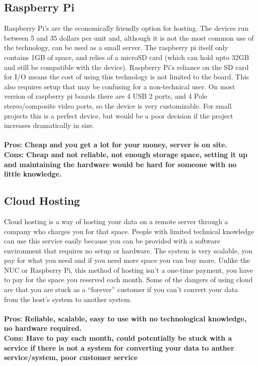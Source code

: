 \documentclass[draftclsnofoot,onecolumn,letterpaper,10pt,compsoc]{IEEEtran}
\begin{document}
	\subsection{Raspberry Pi}
			Raspberry Pi's are the economically friendly option for hosting.
			The devices run between 5 and 35 dollars per unit and, although it is not the most common use of the technology, can be used as a small server\cite{CopaHost}.
			The raspberry pi itself only contains 1GB of space, and relies of a microSD card (which can hold upto 32GB and still be compatible with the device)\cite{CopaHost}.
			Raspberry Pi’s reliance on the SD card for I/O means the cost of using this technology is not limited to the board.
			This also requires setup that may be confusing for a non-technical user.
			On most version of raspberry pi boards there are 4 USB 2 ports, and 4 Pole stereo/composite video ports\cite{RaspberryPi}, so the device is very customizable.
			For small projects this is a perfect device, but would be a poor decision if the project increases dramatically in size.
			\\\\
			\textbf{Pros: Cheap and you get a lot for your money, server is on site.}
			\\
			\textbf{Cons: Cheap and not reliable, not enough storage space, setting it up and maintaining the hardware would be hard for someone with no little knowledge.}

	\subsection{Cloud Hosting}
        Cloud hosting is a way of hosting your data on a remote server through a company who charges you for that space.
				People with limited technical knowledge can use this service easily because you can be provided with a software environment that requires no setup or hardware\cite{InterRoute}.
				The system is very scalable, you pay for what you need and if you need more space you can buy more\cite{InterRoute}.
				Unlike the NUC or Raspberry Pi, this method of hosting isn't a one-time payment, you have to pay for the space you reserved each month\cite{TheBalance}.
				Some of the dangers of using cloud are that you are stuck as a “forever” customer if you can't convert your data from the host's system to another system\cite{TheBalance}.
				\\ \\
				\textbf{Pros: Reliable, scalable, easy to use with no technological knowledge, no hardware required.}
				\\
				\textbf{Cons: Have to pay each month, could potentially be stuck with a service if there is not a system for converting your data to anther service/system, poor customer service}
\end{document}
